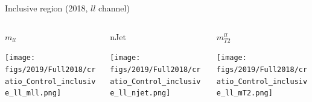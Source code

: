 \documentclass[9pt]{beamer}
\begin{document}
\begin{frame}{Inclusive region (2018, $ll$ channel)}
\begin{columns}
		\begin{column}{0.32\textwidth}
			\begin{center}
			\begin{block}{\centering $m_{ll}$}\end{block}	
     			\texttt{[image: figs/2019/Full2018/cratio\_Control\_inclusive\_ll\_mll.png]}
    		\end{center}		
		\end{column} \hfill
		\begin{column}{0.32\textwidth}
			\begin{center}
				\begin{block}{\centering nJet}\end{block}
     			\texttt{[image: figs/2019/Full2018/cratio\_Control\_inclusive\_ll\_njet.png]}
    		\end{center}		
		\end{column} \hfill
		\begin{column}{0.32\textwidth}
			\begin{center}
				\begin{block}{\centering $m_{T2}^{ll}$}\end{block}
     			\texttt{[image: figs/2019/Full2018/cratio\_Control\_inclusive\_ll\_mT2.png]}
   			 \end{center}
		\end{column} \hfill
	\end{columns}
\end{frame}
\end{document}
